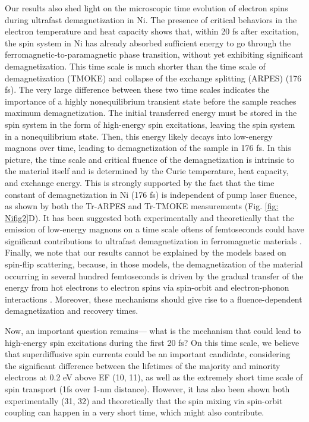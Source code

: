Our results also shed light on the microscopic time evolution of electron spins during ultrafast demagnetization in Ni. The presence of critical behaviors in the electron temperature and heat capacity shows that, within 20 fs after excitation, the spin system in Ni has already absorbed sufficient energy to go through the ferromagnetic-to-paramagnetic phase transition, without yet exhibiting significant demagnetization. This time scale is much shorter than the time scale of demagnetization (TMOKE) and collapse of the exchange splitting (ARPES) (176 fs). The very large difference between these two time scales indicates the importance of a highly nonequilibrium transient state before the sample reaches maximum demagnetization. The initial transferred energy must be stored in the spin system in the form of high-energy spin excitations, leaving the spin system in a nonequilibrium state. Then, this energy likely decays into low-energy magnons over time, leading to demagnetization of the sample in 176 fs. In this picture, the time scale and critical fluence of the demagnetization is intrinsic to the material itself and is determined by the Curie temperature, heat capacity, and exchange energy. This is strongly supported by the fact that the time constant of demagnetization in Ni (176 fs) is independent of pump laser fluence, as shown by both the Tr-ARPES and Tr-TMOKE measurements (Fig. \ref{fig: Nifig2}D). It has been suggested both experimentally and theoretically that the emission of low-energy magnons on a time scale oftens of femtoseconds could have significant contributions to ultrafast demagnetization in ferromagnetic materials \cite{Carpene2015,Zhang2012,Eschenlohr2013,Schmidt2010,Turgut2016}. Finally, we note that our results cannot be explained by the models based on spin-flip scattering, because, in those models, the demagnetization of the material occurring in several hundred femtoseconds is driven by the gradual transfer of the energy from hot electrons to electron spins via spin-orbit and electron-phonon interactions \cite{Koopmans2009,Krauß2009,Mueller2013,Roth2012}. Moreover, these mechanisms should give rise to a fluence-dependent demagnetization and recovery times.

Now, an important question remains— what is the mechanism that could lead to high-energy spin excitations during the first 20 fs? On this time scale, we believe that superdiffusive spin currents could be an important candidate, considering the significant difference between the lifetimes of the majority and minority electrons at 0.2 eV above EF (10, 11), as well as the extremely short time scale of spin transport (1fs over 1-nm distance). However, it has also been shown both experimentally (31, 32) and theoretically \cite{Tows2015,Krieger2015,Zhang2000} that the spin mixing via spin-orbit coupling can happen in a very short time, which might also contribute.

